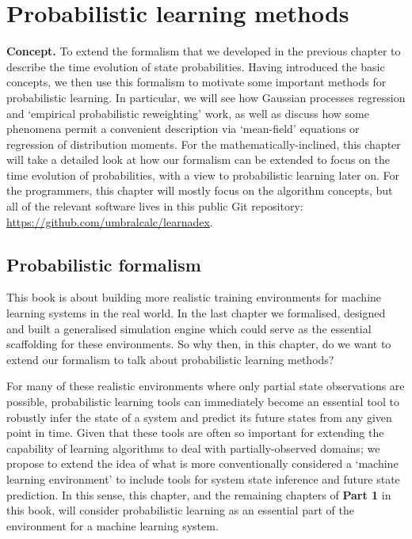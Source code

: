 \chapter{\sffamily Probabilistic learning methods}

{\bfseries\sffamily Concept.} To extend the formalism that we developed in the previous chapter to describe the time evolution of state probabilities. Having introduced the basic concepts, we then use this formalism to motivate some important methods for probabilistic learning. In particular, we will see how Gaussian processes regression and `empirical probabilistic reweighting' work, as well as discuss how some phenomena permit a convenient description via `mean-field' equations or regression of distribution moments. For the mathematically-inclined, this chapter will take a detailed look at how our formalism can be extended to focus on the time evolution of probabilities, with a view to probabilistic learning later on. For the programmers, this chapter will mostly focus on the algorithm concepts, but all of the relevant software lives in this public Git repository: \href{https://github.com/umbralcalc/learndadex}{https://github.com/umbralcalc/learnadex}.

\section{\sffamily Probabilistic formalism} 

This book is about building more realistic training environments for machine learning systems in the real world. In the last chapter we formalised, designed and built a generalised simulation engine which could serve as the essential scaffolding for these environments. So why then, in this chapter, do we want to extend our formalism to talk about probabilistic learning methods?

For many of these realistic environments where only partial state observations are possible, probabilistic learning tools can immediately become an essential tool to robustly infer the state of a system and predict its future states from any given point in time. Given that these tools are often so important for extending the capability of learning algorithms to deal with partially-observed domains; we propose to extend the idea of what is more conventionally considered a `machine learning environment' to include tools for system state inference and future state prediction. In this sense, this chapter, and the remaining chapters of {\bfseries\sffamily Part 1} in this book, will consider probabilistic learning as an essential part of the environment for a machine learning system.


